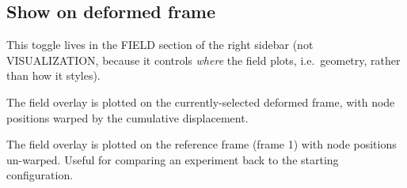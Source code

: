 \subsection{Show on deformed frame}

This toggle lives in the FIELD section of the right sidebar (not
VISUALIZATION, because it controls \emph{where} the field plots,
i.e.\ geometry, rather than how it styles).

\begin{description}[leftmargin=1.2cm,style=nextline]
  \item[Checked (default)]
    The field overlay is plotted on the currently-selected deformed
    frame, with node positions warped by the cumulative
    displacement.
  \item[Unchecked]
    The field overlay is plotted on the reference frame (frame 1)
    with node positions un-warped. Useful for comparing an
    experiment back to the starting configuration.
\end{description}
